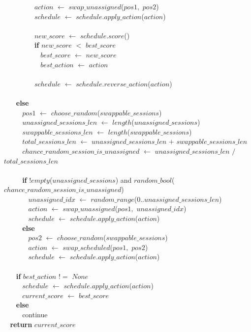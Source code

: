 \begin{tabbing}
$~~~~~~~~~~~~~~~~~~~~$$action$ $\leftarrow$ $swap\_unassigned$($pos1$$,$ $pos2$)\\
$~~~~~~~~~~~~~~~~~~~~$$schedule$ $\leftarrow$ $schedule$$.$$apply\_action$($action$)\\
\\
$~~~~~~~~~~~~~~~~~~~~$$new\_score$ $\leftarrow$ $schedule$$.$$score$()\\
$~~~~~~~~~~~~~~~~~~~~${\bf if} $new\_score$ $<$ $best\_score$\\
$~~~~~~~~~~~~~~~~~~~~~~~~$$best\_score$ $\leftarrow$ $new\_score$\\
$~~~~~~~~~~~~~~~~~~~~~~~~$$best\_action$ $\leftarrow$ $action$\\
\\
$~~~~~~~~~~~~~~~~~~~~$$schedule$ $\leftarrow$ $schedule$$.$$reverse\_action$($action$)\\
$~~~~~~~~~~~~~~~~$\\
$~~~~~~~~${\bf else}\\
$~~~~~~~~~~~~$$pos1$ $\leftarrow$ $choose\_random$($swappable\_sessions$)\\
$~~~~~~~~~~~~$$unassigned\_sessions\_len$ $\leftarrow$ $length$($unassigned\_sessions$)\\
$~~~~~~~~~~~~$$swappable\_sessions\_len$ $\leftarrow$ $length$($swappable\_sessions$)\\
$~~~~~~~~~~~~$$total\_sessions\_len$ $\leftarrow$ $unassigned\_sessions\_len$ $+$ $swappable\_sessions\_len$\\
$~~~~~~~~~~~~$$chance\_random\_session\_is\_unassigned$ $\leftarrow$ $unassigned\_sessions\_len$ $/$ $total\_sessions\_len$\\
\\
$~~~~~~~~~~~~${\bf if} $!$$empty$($unassigned\_sessions$) and $random\_bool$($chance\_random\_session\_is\_unassigned$)\\
$~~~~~~~~~~~~~~~~$$unassigned\_idx$ $\leftarrow$ $random\_range$($0..$$unassigned\_sessions\_len$)\\
$~~~~~~~~~~~~~~~~$$action$ $\leftarrow$ $swap\_unassigned$($pos1$$,$ $unassigned\_idx$)\\
$~~~~~~~~~~~~~~~~$$schedule$ $\leftarrow$ $schedule$$.$$apply\_action$($action$)\\
$~~~~~~~~~~~~${\bf else}\\
$~~~~~~~~~~~~~~~~$$pos2$ $\leftarrow$ $choose\_random$($swappable\_sessions$)\\
$~~~~~~~~~~~~~~~~$$action$ $\leftarrow$ $swap\_scheduled$($pos1$$,$ $pos2$)\\
$~~~~~~~~~~~~~~~~$$schedule$ $\leftarrow$ $schedule$$.$$apply\_action$($action$)\\
$~~~~~~~~$\\
$~~~~~~~~${\bf if} $best\_action$ $!=$ $None$\\
$~~~~~~~~~~~~$$schedule$ $\leftarrow$ $schedule$$.$$apply\_action$($action$)\\
$~~~~~~~~~~~~$$current\_score$ $\leftarrow$ $best\_score$\\
$~~~~~~~~${\bf else}\\
$~~~~~~~~~~~~$continue\\
$~~~~${\bf return} $current\_score$\\
\end{tabbing}